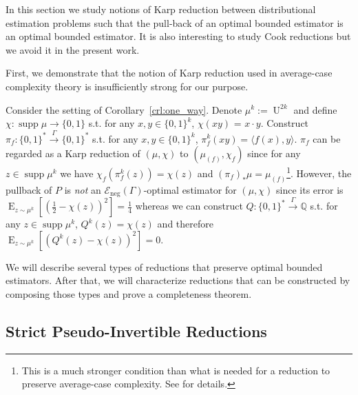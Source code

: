 \documentclass{article}
\numberwithin{equation}{section}
\theoremstyle{definition}
\theoremstyle{plain}
\newcommand{\Bool}{\{0,1\}}
\newcommand{\Words}{{\Bool^*}}
\DeclareMathOperator{\Supp}{supp}
\DeclareMathOperator{\E}{E}
\DeclareMathOperator{\Un}{U}
\newcommand{\Rats}{\mathbb{Q}}
\newcommand{\Chev}[1]{\langle #1 \rangle}
\newcommand{\Fall}{\mathcal{E}}
\newcommand{\Scheme}{\xrightarrow{\Gamma}}
\begin{document}
In this section we study notions of Karp reduction between distributional estimation problems such that the pull-back of an optimal bounded estimator is an optimal bounded estimator. It is also interesting to study Cook reductions but we avoid it in the present work.

First, we demonstrate that the notion of Karp reduction used in average-case complexity theory is insufficiently strong for our purpose. 

Consider the setting of Corollary~\ref{crl:one_way}. Denote $\mu^k:=\Un^{2k}$ and define ${\chi: \Supp \mu \rightarrow \Bool}$ s.t. for any $x,y \in \Bool^k$, $\chi(xy)$ = $x \cdot y$. Construct $\pi_f: \Words \Scheme \Words$ s.t. for any $x,y \in \Bool^k$, ${\pi_f^k(xy) = \Chev{f(x),y}}$. $\pi_f$ can be regarded as a Karp reduction of $(\mu, \chi)$ to $(\mu_{(f)},\chi_f)$ since for any ${z \in \Supp \mu^k}$ we have $\chi_f(\pi_f^k(z))=\chi(z)$ and $(\pi_f)_*\mu=\mu_{(f)}$\footnote{This is a much stronger condition than what is needed for a reduction to preserve average-case complexity. See \cite{Bogdanov_2006} for details.}. However, the pullback of $P$ is \emph{not} an $\Fall_{\text{neg}}(\Gamma)$-optimal estimator for $(\mu,\chi)$ since its error is $\E_{z \sim \mu^k}[(\frac{1}{2}-\chi(z))^2]=\frac{1}{4}$ whereas we can construct $Q: \Words \Scheme \Rats$ s.t. for any $z \in \Supp \mu^k$, $Q^k(z)=\chi(z)$ and therefore $\E_{z \sim \mu^k}[(Q^k(z)-\chi(z))^2]=0$.

We will describe several types of reductions that preserve optimal bounded estimators. After that, we will characterize reductions that can be constructed by composing those types and prove a completeness theorem.

\subsection{Strict Pseudo-Invertible Reductions}
\end{document}
